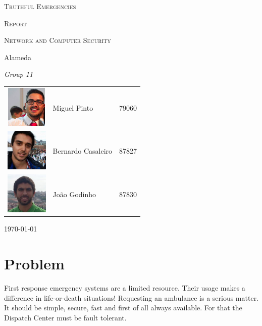 \documentclass[a4paper,titlepage,11pt]{article}
\begin{document}
\begin{titlepage}
  \begin{center}
    {\scshape \huge Truthful Emergencies \par}
    \vspace{1cm}

    {\scshape \LARGE Report \par}
    \vspace{1.5cm}

    {\scshape \Large Network and Computer Security \par}
    \vspace{0.5cm}

    {\Large Alameda \par}
    \vfill

    {\itshape \Large Group 11 \par}
    \vfill

    \begin{tabular}{l l l}
      \includegraphics[width=20mm, height=20mm]{img/miguel.png} & Miguel Pinto & 79060\\
      \includegraphics[width=20mm, height=20mm]{img/bernardo.jpeg} & Bernardo Casaleiro & 87827\\
      \includegraphics[width=20mm, height=20mm]{img/joao.jpeg} & João Godinho & 87830\\
    \end{tabular}
    \vfill

    {\large \today\par}
  \end{center}
\end{titlepage}

\section{Problem}
First response emergency systems are a limited resource. Their usage makes a difference in life-or-death situations!
Requesting an ambulance is a serious matter.
It should be simple, secure, fast and first of all always available.
For that the Dispatch Center must be fault tolerant.
\end{document}
